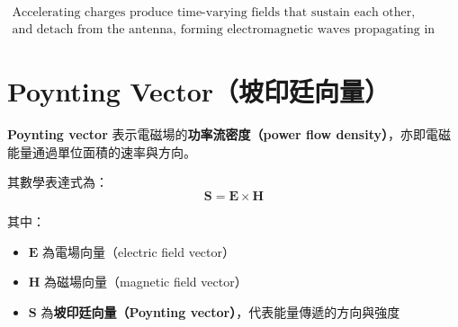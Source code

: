 \documentclass[12pt,a4paper]{article}
\begin{document}
\[
\begin{aligned}
\text{Accelerating charges produce time-varying fields that sustain each other,} \\
\text{and detach from the antenna, forming electromagnetic waves propagating in space.}
\end{aligned}
\]
\section*{Poynting Vector（坡印廷向量）}

\textbf{Poynting vector} 表示電磁場的\textbf{功率流密度（power flow density）}，亦即電磁能量通過單位面積的速率與方向。

其數學表達式為：
\[
\mathbf{S} = \mathbf{E} \times \mathbf{H}
\]

其中：
\begin{itemize}
    \item $\mathbf{E}$ 為電場向量（electric field vector）
    \item $\mathbf{H}$ 為磁場向量（magnetic field vector）
    \item $\mathbf{S}$ 為\textbf{坡印廷向量（Poynting vector）}，代表能量傳遞的方向與強度
\end{itemize}
\end{document}
